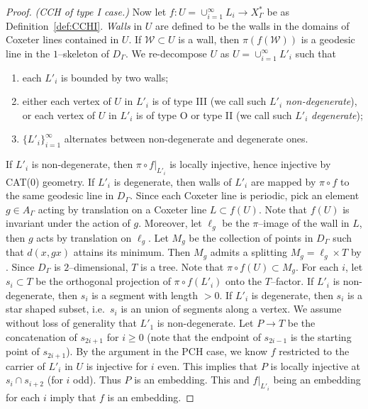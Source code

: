 \documentclass[11pt]{amsart}
\newcommand {\W}{\mathcal W}
\theoremstyle{definition}
\newcommand{\Xa}{X^{\ast}}
\begin{document}
\begin{proof}
\noindent	
\emph{(CCH of type I case.) }
Now let $f\colon U=\cup_{i=1}^{\infty}L_i\to \Xa_\Gamma$ be as Definition~\ref{def:CCHI}. \emph{Walls} in $U$ are defined to be the walls in the domains of Coxeter lines contained in $U$. If $\W\subset U$ is a wall, then $\pi(f(\W))$ is a geodesic line in the $1$--skeleton of $D_\Gamma$. We re-decompose $U$ as $U=\cup_{i=1}^{\infty} L'_i$ such that 
\begin{enumerate}
	\item each $L'_i$ is bounded by two walls;
	\item either each vertex of $U$ in $L'_i$ is of type III (we call such $L'_i$ \emph{non-degenerate}), or each vertex of $U$ in $L'_i$ is of type O or type II (we call such $L'_i$ \emph{degenerate});
	\item $\{L'_i\}_{i=1}^{\infty}$ alternates between non-degenerate and degenerate ones.
\end{enumerate}
If $L'_i$ is non-degenerate, then $\pi\circ f|_{L'_i}$ is locally injective, hence injective by CAT(0) geometry. If $L'_i$ is degenerate, then walls of $L'_i$ are mapped by $\pi\circ f$ to the same geodesic line in $D_\Gamma$. Since each Coxeter line is periodic, pick an element $g\in A_\Gamma$ acting by translation on a Coxeter line $L\subset f(U)$. Note that $f(U)$ is invariant under the action of $g$. Moreover, let $\ell_g$ be the $\pi$--image of the wall in $L$, then $g$ acts by translation on $\ell_g$. Let $M_g$ be the collection of points in $D_\Gamma$ such that $d(x,gx)$ attains its minimum. Then $M_g$ admits a splitting $M_g=\ell_g\times T$ by \cite[Theorem II.6.8]{BridsonHaefliger1999}. Since $D_\Gamma$ is $2$--dimensional, $T$ is a tree. Note that $\pi\circ f(U)\subset M_g$. For each $i$, let $s_i\subset T$ be the orthogonal projection of $\pi\circ f(L'_i)$ onto the $T$--factor. If $L'_i$ is non-degenerate, then $s_i$ is a segment with length $>0$. If $L'_i$ is degenerate, then $s_i$ is a star shaped subset, i.e.\ $s_i$ is an union of segments along a vertex. We assume without loss of generality that $L'_1$ is non-degenerate. Let $P\to T$ be the concatenation of $s_{2i+1}$ for $i\ge 0$ (note that the endpoint of $s_{2i-1}$ is the starting point of $s_{2i+1}$). By the argument in the PCH case, we know $f$ restricted to the carrier of $L'_i$ in $U$ is injective for $i$ even. This implies that $P$ is locally injective at $s_i\cap s_{i+2}$ (for $i$ odd). Thus $P$ is an embedding. This and $f|_{L'_i}$ being an embedding for each $i$ imply that $f$ is an embedding.
\end{proof}
\end{document}
